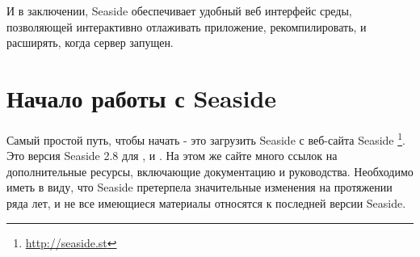 \documentclass[a4paper,10pt,twoside]{book}
\begin{document}
И в заключении, Seaside обеспечивает удобный веб интерфейс среды,
позволяющей интерактивно отлаживать приложение, рекомпилировать,
и расширять, когда сервер запущен.


\section{Начало работы с Seaside}


Самый простой путь, чтобы начать - это загрузить Seaside
 с веб-сайта Seaside \footnote{\url{http://seaside.st}}.
Это версия Seaside 2.8 для ,  и .
На этом же сайте много ссылок на дополнительные ресурсы, включающие документацию и руководства.
Необходимо иметь в виду, что Seaside претерпела значительные изменения на протяжении ряда лет,
и не все имеющиеся материалы относятся к последней версии Seaside.

\end{document}
